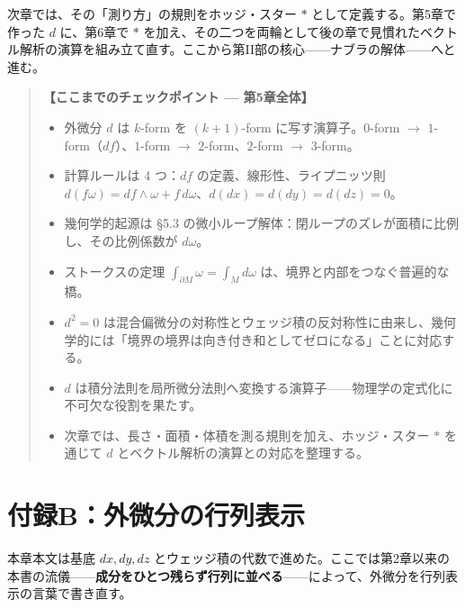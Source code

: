 \documentclass[a4paper,12pt,openany]{book}
\begin{document}
次章では、その「測り方」の規則をホッジ・スター \(\ast\)
として定義する。第5章で作った \(d\) に、第6章で \(\ast\)
を加え、その二つを両輪として後の章で見慣れたベクトル解析の演算を組み立て直す。ここから第II部の核心——ナブラの解体——へと進む。

\par\vspace{0.35em}\par

\begin{quote}
\textbf{【ここまでのチェックポイント — 第5章全体】}

\begin{itemize}
\item
  外微分 \(d\) は \(k\)-form を \((k+1)\)-form に写す演算子。\(0\)-form
  \(\to\) \(1\)-form（\(df\)）、\(1\)-form \(\to\)
  \(2\)-form、\(2\)-form \(\to\) \(3\)-form。
\item
  計算ルールは 4 つ：\(df\) の定義、線形性、ライプニッツ則
  \(d(f\omega) = df\wedge\omega + f\,d\omega\)、\(d(dx)=d(dy)=d(dz)=0\)。
\item
  幾何学的起源は §5.3
  の微小ループ解体：閉ループのズレが面積に比例し、その比例係数が
  \(d\omega\)。
\item
  ストークスの定理 \(\int_{\partial M} \omega = \int_M d\omega\)
  は、境界と内部をつなぐ普遍的な橋。
\item
  \(d^2 = 0\)
  は混合偏微分の対称性とウェッジ積の反対称性に由来し、幾何学的には「境界の境界は向き付き和としてゼロになる」ことに対応する。
\item
  \(d\)
  は積分法則を局所微分法則へ変換する演算子——物理学の定式化に不可欠な役割を果たす。
\item
  次章では、長さ・面積・体積を測る規則を加え、ホッジ・スター \(\ast\)
  を通じて \(d\) とベクトル解析の演算との対応を整理する。
\end{itemize}
\end{quote}

\par\vspace{0.35em}\par

\hypertarget{ux4ed8ux9332bux5916ux5faeux5206ux306eux884cux5217ux8868ux793a}{%
\section{付録B：外微分の行列表示}\label{ux4ed8ux9332bux5916ux5faeux5206ux306eux884cux5217ux8868ux793a}}

本章本文は基底 \(dx, dy, dz\)
とウェッジ積の代数で進めた。ここでは第2章以来の本書の流儀——\textbf{成分をひとつ残らず行列に並べる}——によって、外微分を行列表示の言葉で書き直す。
\end{document}
